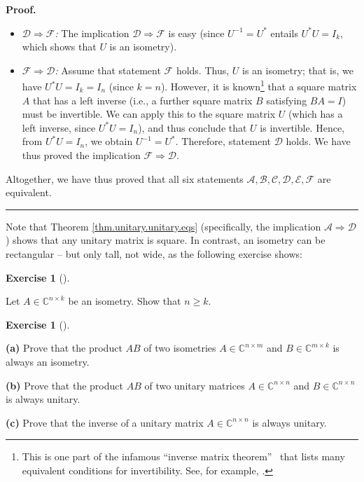 \documentclass[numbers=enddot,12pt,final,onecolumn,notitlepage]{scrartcl}%
\newcounter{exer}
\numberwithin{exer}{subsection}
\theoremstyle{definition}
\newtheorem{exmp}[exer]{Exercise}
\newenvironment{exercise}[1][]
{\begin{exmp}[#1]\begin{leftbar}}
{\end{leftbar}\end{exmp}}
\newenvironment{proof}[1][Proof]{\noindent\textbf{#1.} }{\ \rule{0.5em}{0.5em}}
\begin{document}
\begin{proof}
\begin{itemize}
\item $\mathcal{D}\Longrightarrow\mathcal{F}$\textit{:} The implication
$\mathcal{D}\Longrightarrow\mathcal{F}$ is easy (since $U^{-1}=U^{\ast}$
entails $U^{\ast}U=I_{k}$, which shows that $U$ is an isometry).

\item $\mathcal{F}\Longrightarrow\mathcal{D}$\textit{:} Assume that statement
$\mathcal{F}$ holds. Thus, $U$ is an isometry; that is, we have $U^{\ast
}U=I_{k}=I_{n}$ (since $k=n$). However, it is known\footnote{This is one part
of the infamous \textquotedblleft inverse matrix theorem\textquotedblright%
\ that lists many equivalent conditions for invertibility. See, for example,
\cite[Chapter 2, Proposition 3.8]{Treil15}.} that a square matrix $A$ that has
a left inverse (i.e., a further square matrix $B$ satisfying $BA=I$) must be
invertible. We can apply this to the square matrix $U$ (which has a left
inverse, since $U^{\ast}U=I_{n}$), and thus conclude that $U$ is invertible.
Hence, from $U^{\ast}U=I_{n}$, we obtain $U^{-1}=U^{\ast}$. Therefore,
statement $\mathcal{D}$ holds. We have thus proved the implication
$\mathcal{F}\Longrightarrow\mathcal{D}$.
\end{itemize}

Altogether, we have thus proved that all six statements $\mathcal{A}%
,\mathcal{B},\mathcal{C},\mathcal{D},\mathcal{E},\mathcal{F}$ are equivalent.
\end{proof}

Note that Theorem \ref{thm.unitary.unitary.eqs} (specifically, the implication
$\mathcal{A}\Longrightarrow\mathcal{D}$) shows that any unitary matrix is
square. In contrast, an isometry can be rectangular -- but only tall, not
wide, as the following exercise shows:

\begin{exercise}
\label{exe.unitary.isometry-tall} Let $A\in\mathbb{C}^{n\times k}$ be
an isometry. Show that $n\geq k$.
\end{exercise}

\begin{exercise}
\label{exe.unitary.group} \textbf{(a)} Prove that the product $AB$ of
two isometries $A\in\mathbb{C}^{n\times m}$ and $B\in\mathbb{C}^{m\times k}$
is always an isometry. \medskip

\textbf{(b)} Prove that the product $AB$ of two unitary matrices
$A\in\mathbb{C}^{n\times n}$ and $B\in\mathbb{C}^{n\times n}$ is always
unitary. \medskip

\textbf{(c)} Prove that the inverse of a unitary matrix $A\in\mathbb{C}%
^{n\times n}$ is always unitary.
\end{exercise}
\end{document}
